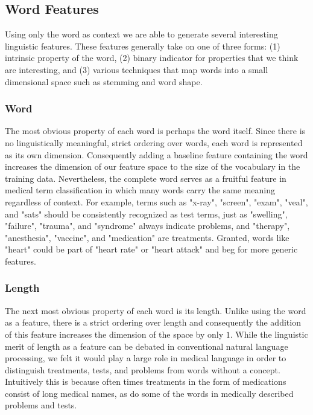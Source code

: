 \documentclass[preprint]{style}
\begin{document}
\subsection{Word Features}
Using only the word as context we are able to generate several interesting linguistic features. These features generally take on one of three forms: (1) intrinsic property of the word, (2) binary indicator for properties that we think are interesting, and (3) various techniques that map words into a small dimensional space such as stemming and word shape.

\subsubsection{Word}
The most obvious property of each word is perhaps the word itself. Since there is no linguistically meaningful, strict ordering over words, each word is represented as its own dimension. Consequently adding a baseline feature containing the word increases the dimension of our feature space to the size of the vocabulary in the training data. Nevertheless, the complete word serves as a fruitful feature in medical term classification in which many words carry the same meaning regardless of context. For example, terms such as "x-ray", "screen", "exam", "veal", and "sats" should be consistently recognized as test terms, just as "swelling", "failure", "trauma", and "syndrome" always indicate problems, and "therapy", "anesthesia", "vaccine", and "medication" are treatments. Granted, words like "heart" could be part of "heart rate" or "heart attack" and beg for more generic features.

\subsubsection{Length}
The next most obvious property of each word is its length. Unlike using the word as a feature, there is a strict ordering over length and consequently the addition of this feature increases the dimension of the space by only $1$. While the linguistic merit of length as a feature can be debated in conventional natural language processing, we felt it would play a large role in medical language in order to distinguish treatments, tests, and problems from words without a concept. Intuitively this is because often times treatments in the form of medications consist of long medical names, as do some of the words in medically described problems and tests.
\end{document}

